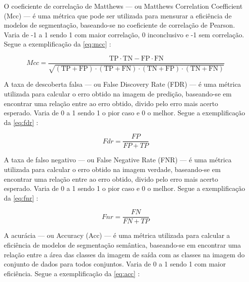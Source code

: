 
O coeficiente de correlação de Matthews — ou Matthews Correlation Coefficient (Mcc) —  é uma métrica que pode ser utilizada para mensurar a eficiência de modelos de segmentação,  baseando-se no coeficiente de correlação de Pearson. Varia de -1 a 1 sendo 1 com maior correlação, 0 inconclusivo e -1 sem correlação. Segue a exemplificação da \cref{eq:mcc} \space\cite{Chicco2020, confusion_matrix_calculator}:

\begin{equation}
	\label{eq:mcc}
	Mcc = \frac{\text{TP}\cdot\text{TN}-\text{FP}\cdot\text{FN}}{\sqrt{ (\text{TP}+\text{FP})\cdot(\text{TP}+\text{FN})\cdot(\text{TN}+\text{FP})\cdot(\text{TN}+\text{FN}) }}
\end{equation}


A taxa de descoberta falsa — ou False Discovery Rate (FDR) — é uma métrica utilizada para calcular o erro obtido na imagem de predição,  baseando-se em encontrar uma relação entre ao erro obtido, divido pelo erro mais acerto esperado. Varia de 0 a 1 sendo 1 o pior caso e 0 o melhor. Segue a exemplificação da \cref{eq:fdr} \space\cite{Chicco2020}:

\begin{equation}
	\label{eq:fdr}
	Fdr = \frac{FP}{FP + TP}
\end{equation}



A taxa de falso negativo — ou False Negative Rate (FNR) — é uma métrica utilizada para calcular o erro obtido na imagem verdade,  baseando-se em encontrar uma relação entre ao erro obtido, divido pelo erro mais acerto esperado. Varia de 0 a 1 sendo 1 o pior caso e 0 o melhor. Segue a exemplificação da \cref{eq:fnr} \space\cite{Chicco2020}:

\begin{equation}
	\label{eq:fnr}
	Fnr = \frac{FN}{FN + TP}
\end{equation}


A acurácia — ou Accuracy (Acc) — é uma métrica utilizada para calcular a eficiência de modelos de segmentação semântica,  baseando-se em encontrar uma relação entre a área das classes da imagem de saída com as classes na imagem do conjunto de dados para todos conjuntos. Varia de 0 a 1 sendo 1 com maior eficiência. Segue a exemplificação da \cref{eq:acc} \space\cite{Chicco2020}:

